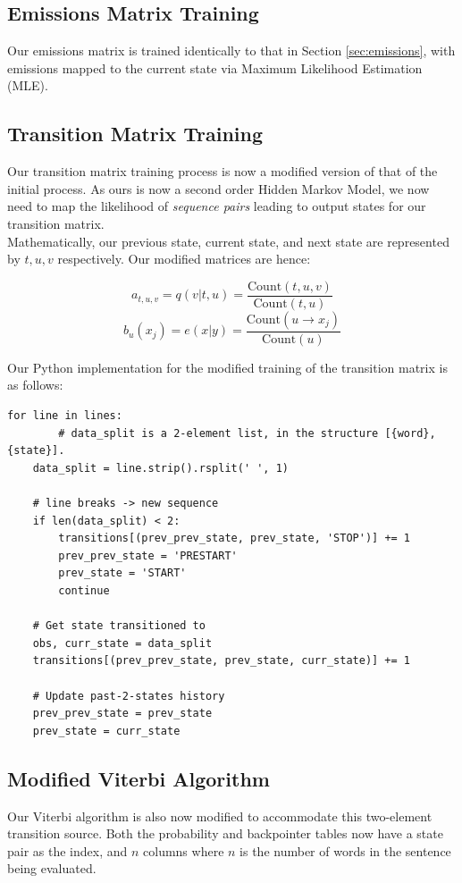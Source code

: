 \documentclass{article}
\numberwithin{equation}{section}
\begin{document}
\subsection{Emissions Matrix Training}
Our emissions matrix is trained identically to that in Section \ref{sec:emissions}, with emissions mapped to the current state via Maximum Likelihood Estimation (MLE).

\subsection{Transition Matrix Training}
Our transition matrix training process is now a modified version of that of the initial process. As ours is now a second order Hidden Markov Model, we now need to map the likelihood of \textit{sequence pairs} leading to output states for our transition matrix.\\

Mathematically, our previous state, current state, and next state are represented by $t, u, v$ respectively. Our modified matrices are hence:

$$ a_{t, u, v} = q(v | t, u) = \frac{\text{Count}(t, u, v)}{\text{Count}(t, u)} $$
$$ b_u(x_j) = e(x | y) = \frac{\text{Count}(u \rightarrow x_j)}{\text{Count}(u)} $$

Our Python implementation for the modified training of the transition matrix is as follows:

\begin{verbatim}
for line in lines:
		# data_split is a 2-element list, in the structure [{word}, {state}].
    data_split = line.strip().rsplit(' ', 1)

    # line breaks -> new sequence
    if len(data_split) < 2:
        transitions[(prev_prev_state, prev_state, 'STOP')] += 1
        prev_prev_state = 'PRESTART'
        prev_state = 'START'
        continue

    # Get state transitioned to
    obs, curr_state = data_split
    transitions[(prev_prev_state, prev_state, curr_state)] += 1

    # Update past-2-states history
    prev_prev_state = prev_state
    prev_state = curr_state
\end{verbatim}

\subsection{Modified Viterbi Algorithm}

Our Viterbi algorithm is also now modified to accommodate this two-element transition source. Both the probability and backpointer tables now have a state pair as the index, and $n$ columns where $n$ is the number of words in the sentence being evaluated.
\end{document}
